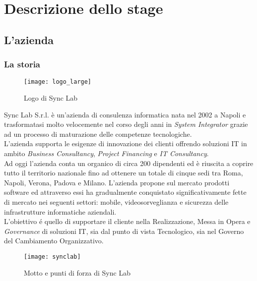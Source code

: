 
\chapter{Descrizione dello stage}
\label{cap:descrizione-stage}



\section{L'azienda}

\subsection{La storia}

\begin{figure}[H]
	\begin{center}
		\texttt{[image: logo\_large]}
		\caption{Logo di Sync Lab}
	\end{center}
\end{figure}

Sync Lab S.r.l. è un'azienda di consulenza informatica nata nel 2002 a Napoli e trasformatasi molto velocemente nel corso degli anni in \textit{System Integrator} grazie ad un processo di maturazione delle competenze tecnologiche.\\ L'azienda supporta le esigenze di innovazione dei clienti offrendo soluzioni IT in ambito \textit{Business Consultancy}, \textit{Project Financing} e \textit{IT Consultancy}.\\
Ad oggi l'azienda conta un organico di circa 200 dipendenti ed è riuscita a coprire tutto il territorio nazionale fino ad ottenere un totale di cinque sedi tra Roma, Napoli, Verona, Padova e Milano. L'azienda propone sul mercato prodotti software ed attraverso essi ha gradualmente conquistato significativamente fette di mercato nei seguenti settori: mobile, videosorveglianza e sicurezza delle infrastrutture informatiche aziendali.\\
L'obiettivo é quello di supportare il cliente nella Realizzazione, Messa in Opera e \textit{Governance} di soluzioni IT, sia dal punto di vista Tecnologico, sia nel Governo del Cambiamento Organizzativo.
\begin{figure}[H]
	\begin{center}
		\texttt{[image: synclab]}
		\caption{Motto e punti di forza di Sync Lab}
	\end{center}
\end{figure}

